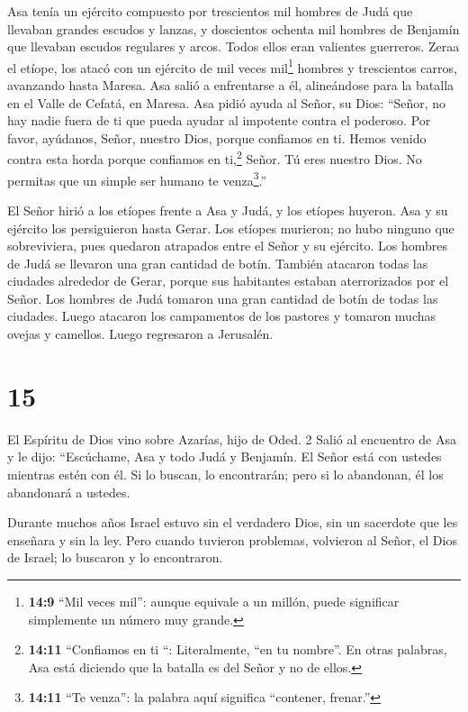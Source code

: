  Asa tenía un ejército compuesto por trescientos mil hombres
de Judá que llevaban grandes escudos y lanzas, y doscientos ochenta mil
hombres de Benjamín que llevaban escudos regulares y arcos. Todos ellos
eran valientes guerreros.  Zeraa el etíope, los atacó con un
ejército de mil veces mil\footnote{\textbf{14:9} ``Mil veces mil'':
  aunque equivale a un millón, puede significar simplemente un número
  muy grande.} hombres y trescientos carros, avanzando hasta Maresa.
 Asa salió a enfrentarse a él, alineándose para la batalla
en el Valle de Cefatá, en Maresa.  Asa pidió ayuda al
Señor, su Dios: ``Señor, no hay nadie fuera de ti que pueda ayudar al
impotente contra el poderoso. Por favor, ayúdanos, Señor, nuestro Dios,
porque confiamos en ti. Hemos venido contra esta horda porque confiamos
en ti,\footnote{\textbf{14:11} ``Confiamos en ti ``: Literalmente, ``en
  tu nombre''. En otras palabras, Asa está diciendo que la batalla es
  del Señor y no de ellos.} Señor. Tú eres nuestro Dios. No permitas que
un simple ser humano te venza\footnote{\textbf{14:11} ``Te venza'': la
  palabra aquí significa ``contener, frenar.''}.''

 El Señor hirió a los etíopes frente a Asa y Judá, y los
etíopes huyeron.  Asa y su ejército los persiguieron hasta
Gerar. Los etíopes murieron; no hubo ninguno que sobreviviera, pues
quedaron atrapados entre el Señor y su ejército. Los hombres de Judá se
llevaron una gran cantidad de botín.  También atacaron
todas las ciudades alrededor de Gerar, porque sus habitantes estaban
aterrorizados por el Señor. Los hombres de Judá tomaron una gran
cantidad de botín de todas las ciudades.  Luego atacaron
los campamentos de los pastores y tomaron muchas ovejas y camellos.
Luego regresaron a Jerusalén.

\hypertarget{section-14}{%
\section{15}\label{section-14}}

 El Espíritu de Dios vino sobre Azarías, hijo de Oded. 2
Salió al encuentro de Asa y le dijo: ``Escúchame, Asa y todo Judá y
Benjamín. El Señor está con ustedes mientras estén con él. Si lo buscan,
lo encontrarán; pero si lo abandonan, él los abandonará a ustedes.

 Durante muchos años Israel estuvo sin el verdadero Dios,
sin un sacerdote que les enseñara y sin la ley.  Pero cuando
tuvieron problemas, volvieron al Señor, el Dios de Israel; lo buscaron y
lo encontraron.

